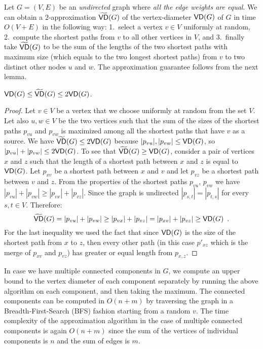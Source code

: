 Let $G=(V,E)$ be an \emph{undirected} graph where \emph{all the edge weights are
equal}.
We can obtain a $2$-approximation $\widetilde{\mathsf{VD}}(G)$ of the vertex-diameter $\mathsf{VD}(G)$ of
$G$ in time $O(V+E)$ in the following way: 1.~select a vertex $v\in V$ uniformly
at random, 2.~compute the shortest paths from $v$ to all other vertices in $V$,
and 3.~finally take $\widetilde{\mathsf{VD}}(G)$ to be the sum of the lengths of the two
shortest paths with maximum size (which equals to the two longest shortest
paths) from $v$ to two distinct other nodes $u$ and $w$. The approximation
guarantee follows from the next lemma.

\begin{lemma}\label{lem:diam}
  $\mathsf{VD}(G)\le\widetilde{\mathsf{VD}}(G)\le 2\mathsf{VD}(G)$.
\end{lemma}
\begin{proof}
  Let $v\in V$ be a vertex that we choose uniformly at random from the set $V$.
  Let also $u,w\in V$ be the two vertices such that the sum of the sizes of the
  shortest paths $p_{vu}$ and $p_{vw}$ is maximized among all the shortest paths
  that have $v$ as a source.  We have $\widetilde{\mathsf{VD}}(G)\le 2\mathsf{VD}(G)$ because
  $|p_{vu}|,|p_{vw}|\le\mathsf{VD}(G)$, so $|p_{vu}|+|p_{vw}|\le 2\mathsf{VD}(G)$. To see
  that $\widetilde{\mathsf{VD}}(G)\ge\mathsf{VD}(G)$, consider a pair of vertices $x$ and $z$ such
  that the length of a shortest path between $x$ and $z$ is equal to $\mathsf{VD}(G)$.
  Let $p_{xv}$ be a shortest path between $x$ and $v$ and let $p_{vz}$ be a
  shortest path between $v$ and $z$. 
  From the properties of the shortest paths $p_{vu}$, $p_{vw}$ we have
  $|p_{vu}|+|p_{vw}|\geq |p_{vx}|+|p_{vz}|$. Since the graph is undirected
  $|p_{s,t}|=|p_{t,s}|$ for every $s,t\in V$.
  Therefore:
  \[
    \widetilde{\mathsf{VD}}(G) = |p_{vu}|+|p_{vw}|\geq |p_{vx}|+|p_{vz}| =
    |p_{xv}|+|p_{vz}|\ge\mathsf{VD}(G)\enspace. 
  \]
  For the last inequality we used the fact that since $\mathsf{VD}(G)$ is the size of
  the shortest path from $x$ to $z$, then every other path (in this case
  $p'_{xz}$ which is the merge of $p_{xv}$ and $p_{vz}$) has greater or equal
  length from $p_{x,z}$.
\end{proof}

In case we have multiple connected components in $G$, we compute an upper bound
to the vertex diameter of each component separately by running the above
algorithm on each component, and then taking the maximum. 
The connected components can be computed in $O(n+m)$ by traversing the graph in
a Breadth-First-Search (BFS) fashion starting from a random $v$.
The time complexity of the approximation algorithm in the case of multiple
connected components is again $O(n+m)$ since the sum of the vertices of
individual components is $n$ and the sum of edges is $m$. 

